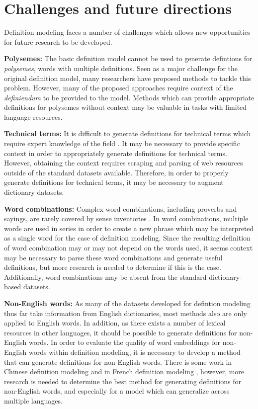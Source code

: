 \section{Challenges and future directions}
Definition modeling faces a number of challenges which allows new opportunities
for future research to be developed.

\textbf{Polysemes:} The basic definition model cannot be used to generate
defintions for \textit{polysemes}, words with multiple definitions. Seen as a
major challenge for the original definition model, many researchers have
proposed methods to tackle this problem. However, many of the proposed
approaches require context of the \textit{definiendum} to be provided to the
model. Methods which can provide appropriate definitions for polysemes without
context may be valuable in tasks with limited language resources.

\textbf{Technical terms:} It is difficult to generate definitions for technical
terms which require expert knowledge of the field \cite{huang_cdm_2021}. It may
be necessary to provide specific context in order to appropriately generate
definitions for technical terms. However, obtaining the context requires
scraping and parsing of web resources outside of the standard datasets
available. Therefore, in order to properly generate definitions for technical
terms, it may be necessary to augment dictionary datasets.

\textbf{Word combinations:} Complex word combinations, including proverbs and
sayings, are rarely covered by sense inventories
\cite{bevilacqua_generationary_2020}. In word combinations, multiple words are
used in series in order to create a new phrase which may be interpreted as a
single word for the case of definition modeling. Since the resulting definition
of  word combination may or may not depend on the words used, it seems context
may be necessary to parse these word combinations and generate useful
definitions, but more research is needed to determine if this is the case.
Additionally, word combinations may be absent from the standard dictionary-based
datasets.

\textbf{Non-English words:} As many of the datasets developed for defintion
modeling thus far take information from English dictionaries, most methods also
are only applied to English words. In addition, as there exists a number of lexical
resources in other languages, it should be possible to generate definitions for
non-English words. In order to evaluate the quality of word embeddings for
non-English words within definition modeling, it is necessary to develop a
method that can generate definitions for non-English words. There is some work
in Chinese definition modeling \cite{zheng_decompose_2021} and in French
definition modeling \cite{reid_vcdm_2020}, however, more research is needed to
determine the best method for generating definitions for non-English words, and
especially for a model which can generalize across multiple languages.

